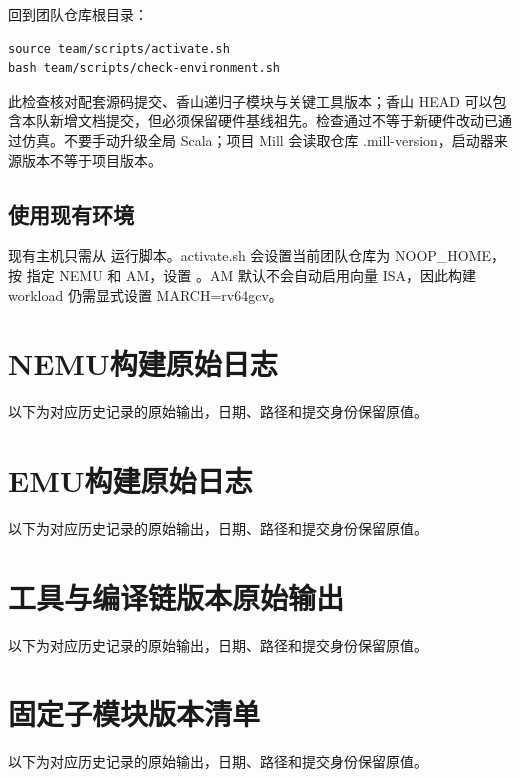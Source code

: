 回到团队仓库根目录：\par


\begin{Verbatim}[breaklines,breakanywhere,breaksymbolleft={},breaksymbolright={},fontsize=\footnotesize,baselinestretch=1]
source team/scripts/activate.sh
bash team/scripts/check-environment.sh
\end{Verbatim}


此检查核对配套源码提交、香山递归子模块与关键工具版本；香山 HEAD 可以包含本队新增文档提交，但必须保留硬件基线祖先。检查通过不等于新硬件改动已通过仿真。不要手动升级全局 Scala；项目 Mill 会读取仓库 .mill-version，启动器来源版本不等于项目版本。\par


\subsection{使用现有环境}


现有主机只需从  运行脚本。activate.sh 会设置当前团队仓库为 NOOP\_HOME，按  指定 NEMU 和 AM，设置 。AM 默认不会自动启用向量 ISA，因此构建 workload 仍需显式设置 MARCH=rv64gcv。\par\section{NEMU构建原始日志}
以下为对应历史记录的原始输出，日期、路径和提交身份保留原值。
\section{EMU构建原始日志}
以下为对应历史记录的原始输出，日期、路径和提交身份保留原值。
\section{工具与编译链版本原始输出}
以下为对应历史记录的原始输出，日期、路径和提交身份保留原值。
\section{固定子模块版本清单}
以下为对应历史记录的原始输出，日期、路径和提交身份保留原值。

